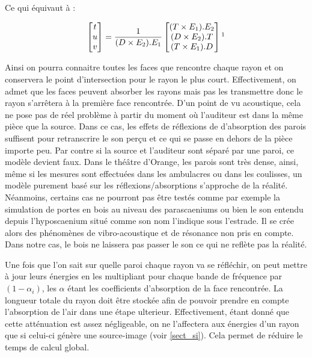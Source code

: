 Ce qui équivaut à : 

\begin{equation}
	\begin{bmatrix}
 	 t \\
	 u \\
	 v
	\end{bmatrix}
	=
	\frac{1}{
 	  (D \times E_2).E_1
	}
	\begin{bmatrix}
 		  (T \times E_1).E_2
 \\ 
 		  (D \times E_2).T
 \\
 		  (T \times E_1).D
	\end{bmatrix}	
	\footnotemark
\end{equation}

Ainsi on pourra connaitre toutes les faces que rencontre chaque rayon et on conservera le point d'intersection pour le rayon le plus court. Effectivement, on admet que les faces peuvent absorber les rayons mais pas les transmettre donc le rayon s'arrêtera à la première face rencontrée. D'un point de vu acoustique, cela ne pose pas de réel problème à partir du moment où l'auditeur est dans la même pièce que la source. Dans ce cas, les effets de réflexions de d'absorption des parois suffisent pour retranscrire le son perçu et ce qui se passe en dehors de la pièce importe peu. Par contre si la source et l'auditeur sont séparé par une paroi, ce modèle devient faux. Dans le théâtre d'Orange, les parois sont très dense, ainsi, même si les mesures sont effectuées dans les \glspl{ambulacre} ou dans les coulisses, un modèle purement basé sur les réflexions/absorptions s'approche de la réalité. Néanmoins, certains cas ne pourront pas être testés comme par exemple la simulation de portes en bois au niveau des \glspl{parascaenium} ou bien le son entendu depuis l'\gls{hyposcaenium} situé comme son nom l'indique sous l'estrade. Il se crée alors des phénomènes de vibro-acoustique et de résonance non pris en compte. Dans notre cas, le bois ne laissera pas passer le son ce qui ne reflète pas la réalité.

Une fois que l'on sait sur quelle paroi chaque rayon va se réfléchir, on peut mettre à jour leurs énergies en les multipliant pour chaque bande de fréquence par $(1-\alpha_i)$, les $\alpha$ étant les coefficients d'absorption de la face rencontrée. La longueur totale du rayon doit être stockée afin de pouvoir prendre en compte l'absorption de l'air dans une étape ulterieur. Effectivement, étant donné que cette atténuation est assez négligeable, on ne l'affectera aux énergies d'un rayon que si celui-ci génère une source-image (voir \ref{sect_si}). Cela permet de réduire le temps de calcul global. 

